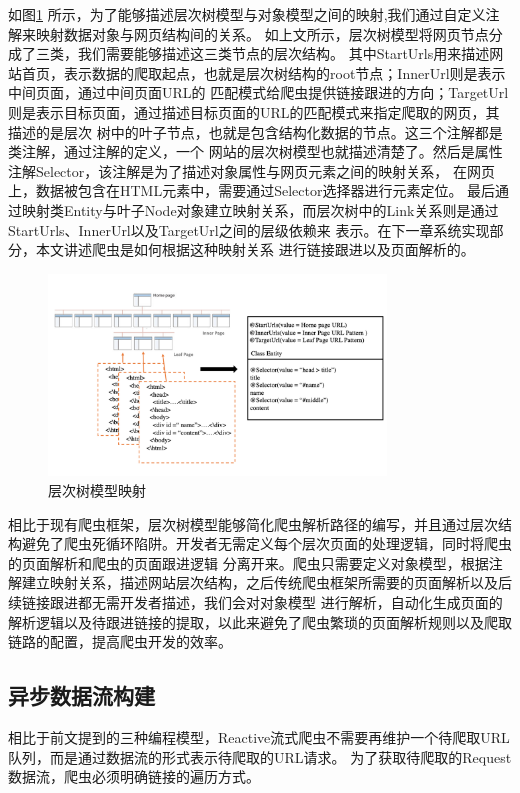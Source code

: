 \documentclass[master]{njuthesis}
\begin{document}
如图\ref{fig:mapper} 所示，为了能够描述层次树模型与对象模型之间的映射,我们通过自定义注解来映射数据对象与网页结构间的关系。
如上文所示，层次树模型将网页节点分成了三类，我们需要能够描述这三类节点的层次结构。
其中StartUrls用来描述网站首页，表示数据的爬取起点，也就是层次树结构的root节点；InnerUrl则是表示中间页面，通过中间页面URL的
匹配模式给爬虫提供链接跟进的方向；TargetUrl则是表示目标页面，通过描述目标页面的URL的匹配模式来指定爬取的网页，其描述的是层次
树中的叶子节点，也就是包含结构化数据的节点。这三个注解都是类注解，通过注解的定义，一个
网站的层次树模型也就描述清楚了。然后是属性注解Selector，该注解是为了描述对象属性与网页元素之间的映射关系，
在网页上，数据被包含在HTML元素中，需要通过Selector选择器进行元素定位。
最后通过映射类Entity与叶子Node对象建立映射关系，而层次树中的Link关系则是通过StartUrls、InnerUrl以及TargetUrl之间的层级依赖来
表示。在下一章系统实现部分，本文讲述爬虫是如何根据这种映射关系
进行链接跟进以及页面解析的。

\begin{figure}[htbp]{}
\centering
\includegraphics[width= 0.8\textwidth]{pic/mapper.png}
\caption{层次树模型映射}\label{fig:mapper}
\end{figure}

相比于现有爬虫框架，层次树模型能够简化爬虫解析路径的编写，并且通过层次结构避免了爬虫死循环陷阱。开发者无需定义每个层次页面的处理逻辑，同时将爬虫的页面解析和爬虫的页面跟进逻辑
分离开来。爬虫只需要定义对象模型，根据注解建立映射关系，描述网站层次结构，之后传统爬虫框架所需要的页面解析以及后续链接跟进都无需开发者描述，我们会对对象模型
进行解析，自动化生成页面的解析逻辑以及待跟进链接的提取，以此来避免了爬虫繁琐的页面解析规则以及爬取链路的配置，提高爬虫开发的效率。

\subsection{异步数据流构建}
相比于前文提到的三种编程模型，Reactive流式爬虫不需要再维护一个待爬取URL队列，而是通过数据流的形式表示待爬取的URL请求。
为了获取待爬取的Request数据流，爬虫必须明确链接的遍历方式。
\end{document}
